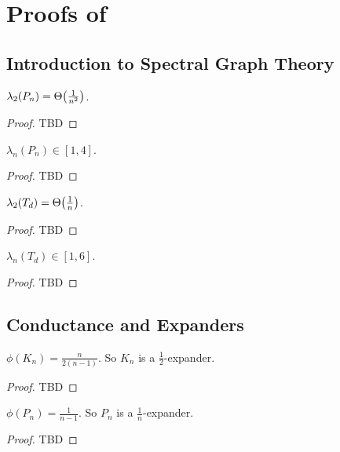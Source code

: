 
\chapter{Proofs of }

\section{Introduction to Spectral Graph Theory}

\begin{lem}\label{lem:c1}
$\lambda_2(P_n) = \Theta\parentheses*{\frac{1}{n^2}}$.
\end{lem}
\begin{proof}
TBD
\end{proof}

\begin{lem}\label{lem:c2}
$\lambda_n(P_n) \in [1,4]$.
\end{lem}
\begin{proof}
TBD
\end{proof}

\begin{lem}\label{lem:c3}
$\lambda_2(T_d) = \Theta\parentheses*{\frac{1}{n}}$.
\end{lem}
\begin{proof}
TBD
\end{proof}

\begin{lem}\label{lem:c4}
$\lambda_n(T_d) \in [1,6]$.
\end{lem}
\begin{proof}
TBD
\end{proof}

\section{Conductance and Expanders}

\begin{lem}\label{lem:c5}
$\phi(K_n) = \frac{n}{2(n-1)}$. So $K_n$ is a $\frac{1}{2}$-expander.
\end{lem}
\begin{proof}
TBD
\end{proof}

\begin{lem}\label{lem:c6}
$\phi(P_n) = \frac{1}{n-1}$. So $P_n$ is a $\frac{1}{n}$-expander.
\end{lem}
\begin{proof}
TBD
\end{proof}